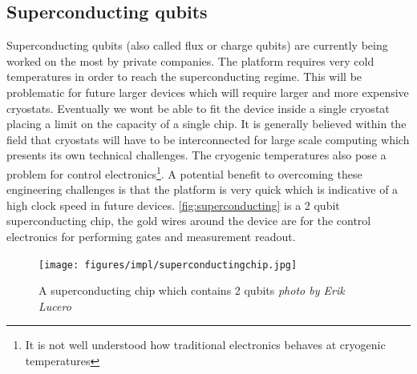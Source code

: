 \subsection{Superconducting qubits}

Superconducting qubits (also called flux or charge qubits) are currently being worked on the most by private companies. The platform requires very cold temperatures in order to reach the superconducting regime. This will be problematic for future larger devices which will require larger and more expensive cryostats. Eventually we wont be able to fit the device inside a single cryostat placing a limit on the capacity of a single chip. It is generally believed within the field that cryostats will have to be interconnected for large scale computing which presents its own technical challenges. The cryogenic temperatures also pose a problem for control electronics\footnote{It is not well understood how traditional electronics behaves at cryogenic temperatures}.   
A potential benefit to overcoming these engineering challenges is that the platform is very quick which is indicative of a high clock speed in future devices. \autoref{fig:superconducting} is a 2 qubit superconducting chip, the gold wires around the device are for the control electronics for performing gates and measurement readout. 

\begin{figure}[H]
    \centering
    \texttt{[image: figures/impl/superconductingchip.jpg]}
    \caption{A superconducting chip which contains 2 qubits \cite{supercondpic} \textit{photo by Erik Lucero} \footnotemark}
    \label{fig:superconducting}
\end{figure}

